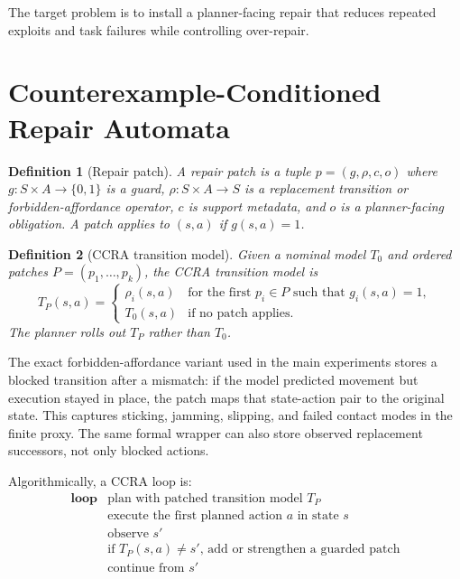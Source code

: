 \documentclass{article}
\newtheorem{definition}{Definition}
\begin{document}
The target problem is to install a planner-facing repair that reduces repeated exploits and task failures while controlling over-repair.

\section{Counterexample-Conditioned Repair Automata}

\begin{definition}[Repair patch]
A repair patch is a tuple $p=(g,\rho,c,o)$ where $g:S\times A\rightarrow\{0,1\}$ is a guard, $\rho:S\times A\rightarrow S$ is a replacement transition or forbidden-affordance operator, $c$ is support metadata, and $o$ is a planner-facing obligation. A patch applies to $(s,a)$ if $g(s,a)=1$.
\end{definition}

\begin{definition}[CCRA transition model]
Given a nominal model $T_0$ and ordered patches $P=(p_1,\ldots,p_k)$, the CCRA transition model is
\[
T_P(s,a) =
\begin{cases}
\rho_i(s,a) & \text{for the first } p_i \in P \text{ such that } g_i(s,a)=1,\\
T_0(s,a) & \text{if no patch applies.}
\end{cases}
\]
The planner rolls out $T_P$ rather than $T_0$.
\end{definition}

The exact forbidden-affordance variant used in the main experiments stores a blocked transition after a mismatch: if the model predicted movement but execution stayed in place, the patch maps that state-action pair to the original state. This captures sticking, jamming, slipping, and failed contact modes in the finite proxy. The same formal wrapper can also store observed replacement successors, not only blocked actions.

Algorithmically, a CCRA loop is:
\[
\begin{array}{ll}
\textbf{loop} & \text{plan with patched transition model } T_P \\
              & \text{execute the first planned action } a \text{ in state } s \\
              & \text{observe } s' \\
              & \text{if } T_P(s,a)\neq s' \text{, add or strengthen a guarded patch} \\
              & \text{continue from } s'
\end{array}
\]
\end{document}
